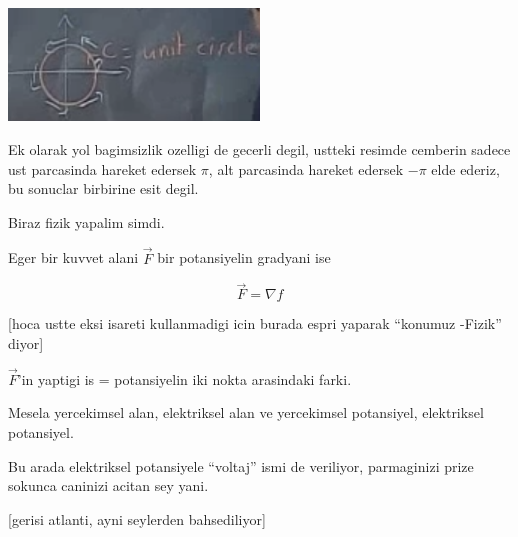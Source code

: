 \documentclass[12pt,fleqn]{article}
\begin{document}
\includegraphics[height=3cm]{20_9.png}

Ek olarak yol bagimsizlik ozelligi de gecerli degil, ustteki resimde
cemberin sadece ust parcasinda hareket edersek $\pi$, alt parcasinda
hareket edersek $-\pi$ elde ederiz, bu sonuclar birbirine esit degil. 

Biraz fizik yapalim simdi.

Eger bir kuvvet alani $\vec{F}$ bir potansiyelin gradyani ise 

\[ \vec{F} = \nabla f \]

[hoca ustte eksi isareti kullanmadigi icin burada espri yaparak ``konumuz
-Fizik'' diyor]

$\vec{F}$'in yaptigi is = potansiyelin iki nokta arasindaki farki. 

Mesela yercekimsel alan, elektriksel alan ve yercekimsel potansiyel,
elektriksel potansiyel. 

Bu arada elektriksel potansiyele ``voltaj'' ismi de veriliyor, parmaginizi
prize sokunca caninizi acitan sey yani. 

[gerisi atlanti, ayni seylerden bahsediliyor]
\end{document}
